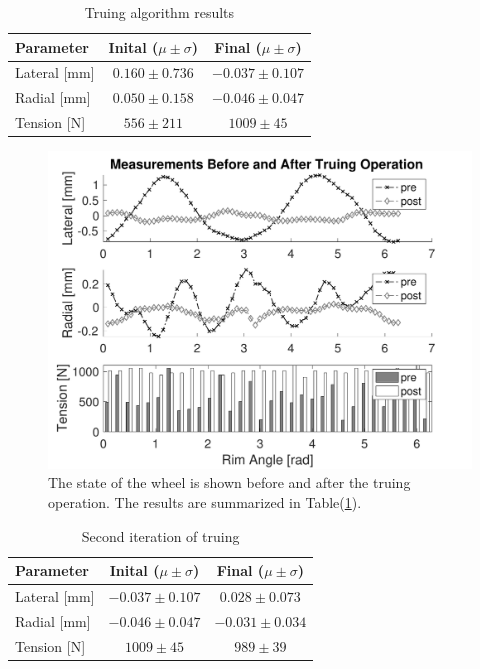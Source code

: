 \documentclass[journal]{IEEEtran}
\begin{document}
\begin{table}[!t]
\caption{Truing algorithm results}
\label{tbl:exp2}
\centering
\begin{tabular}{| l | c | c |}
    \hline
    Parameter & Inital ($\mu \pm \sigma$) & Final ($\mu \pm \sigma$)\\ \hline
    Lateral [mm] & $0.160\pm0.736$ &$-0.037\pm 0.107$ \\ \hline 
    Radial [mm] &$0.050\pm0.158$& $-0.046\pm0.047$ \\ \hline 
    Tension [N] &$556\pm211$& $1009\pm45$ \\ \hline
\end{tabular}
\end{table}

\begin{figure}[!t]
\centering
\includegraphics[width=3.25 in]{./figs/exp2}
\caption{The state of the wheel is shown before and after the truing operation. The results are summarized in Table(\ref{tbl:exp2}).}
\label{fig:exp2}
\end{figure}

\begin{table}[!t]
\caption{Second iteration of truing}
\label{tbl:exp3}
\centering
\begin{tabular}{| l | c | c |}
    \hline
    Parameter & Inital ($\mu \pm \sigma$) & Final ($\mu \pm \sigma$)\\ \hline
    Lateral [mm] & $-0.037\pm0.107$ &$0.028\pm 0.073$ \\ \hline 
    Radial [mm] &$-0.046\pm0.047$& $-0.031\pm0.034$ \\ \hline 
    Tension [N] &$1009\pm45$& $989\pm39$ \\ \hline 
\end{tabular}
\end{table}


\end{document}
